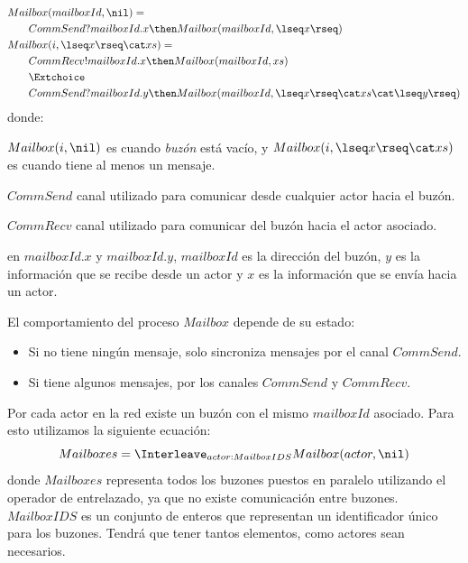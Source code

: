 \begin{align}\label{eq:mailbox}
\begin{split}
Mai&lbox(mailboxId, \nil) = {} \\
&CommSend?mailboxId.x \then Mailbox(mailboxId, \lseq x \rseq) \\
Mai&lbox(i, \lseq x \rseq \cat xs ) = {} \\ 
   &CommRecv!mailboxId.x \then Mailbox(mailboxId, xs) \\
   &\Extchoice \\
   &CommSend?mailboxId.y \then Mailbox(mailboxId, \lseq x \rseq \cat xs \cat \lseq y \rseq ) 
\end{split}
\end{align}
donde:
\begin{description}
 \item $Mailbox(i, \nil)$ es cuando \textit{buzón} está vacío, y $Mailbox(i, \lseq x \rseq \cat xs )$ es cuando tiene al menos un mensaje. 
 \item $CommSend$ canal utilizado para comunicar desde cualquier actor hacia el buzón.
 \item $CommRecv$ canal utilizado para comunicar del buzón hacia el actor asociado.
 \item en $mailboxId.x$ y $mailboxId.y$, $mailboxId$ es la dirección del buzón, $y$ es la información que se recibe desde un actor y $x$ es la información que se envía hacia un actor.
 \end{description}
El comportamiento del proceso $Mailbox$ depende de su estado:
\begin{itemize}
\item Si no tiene ningún mensaje, solo sincroniza mensajes por el canal $CommSend$.
\item Si tiene algunos mensajes, por los canales $CommSend$ y $CommRecv$.
\end{itemize}

Por cada actor en la red existe un buzón con el mismo $mailboxId$ asociado. Para esto utilizamos la siguiente ecuación:
\begin{equation}\label{eq:mailboxes}
Mailboxes = \Interleave_{ actor : MailboxIDS } Mailbox(actor, \nil) 
\end{equation}
donde $Mailboxes$ representa todos los buzones puestos en paralelo utilizando el operador de entrelazado, ya que no existe comunicación entre buzones. $MailboxIDS$ es un conjunto de enteros que representan un identificador único para los buzones. Tendrá que tener tantos elementos, como actores sean necesarios.

